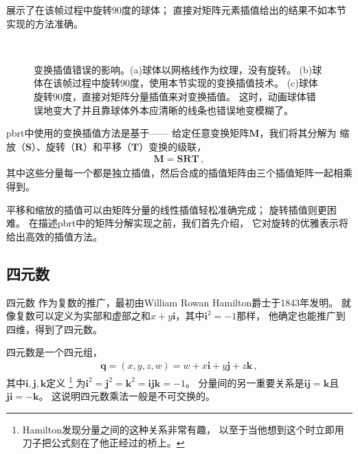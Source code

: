 展示了在该帧过程中旋转90度的球体；
直接对矩阵元素插值给出的结果不如本节实现的方法准确。
\begin{figure}[htbp]
    \raggedright
    \\%
    \quad%
    \begin{minipage}{0.45\textwidth}
        \vspace{-\linewidth}\caption{变换插值错误的影响。(a)球体以网格线作为纹理，没有旋转。
            (b)球体在该帧过程中旋转90度，使用本节实现的变换插值技术。
            (c)球体旋转90度，直接对矩阵分量插值来对变换插值。
            这时，动画球体错误地变大了并且靠球体外本应清晰的线条也错误地变模糊了。}
        \label{fig:2.16}
    \end{minipage}
\end{figure}

pbrt中使用的变换插值方法是基于——
给定任意变换矩阵$\bm M$，我们将其分解为
缩放（$\bm S$）、旋转（$\bm R$）和平移（$\bm T$）变换的级联，
\begin{align*}
    \bm M=\bm S\bm R\bm T\, ,
\end{align*}
其中这些分量每一个都是独立插值，然后合成的插值矩阵由三个插值矩阵一起相乘得到。

平移和缩放的插值可以由矩阵分量的线性插值轻松准确完成；
旋转插值则更困难。
在描述pbrt中的矩阵分解实现之前，我们首先介绍，
它对旋转的优雅表示将给出高效的插值方法。

\subsection{四元数}\label{sub:四元数}
四元数
作为复数的推广，最初由William Rowan Hamilton爵士于1843年发明。
就像复数可以定义为实部和虚部之和$x+y\mathbf{i}$，其中$\mathbf{i}^2=-1$那样，
他确定也能推广到四维，得到了四元数。

四元数是一个四元组，
\begin{align}\label{eq:2.4}
    \bm q=(x,y,z,w)=w+x\mathbf{i}+y\mathbf{j}+z\mathbf{k}\, ,
\end{align}
其中$\mathbf{i}, \mathbf{j}, \mathbf{k}$定义
\footnote{Hamilton发现分量之间的这种关系非常有趣，
    以至于当他想到这个时立即用刀子把公式刻在了他正经过的桥上。}
为$\mathbf{i}^2=\mathbf{j}^2=\mathbf{k}^2=\mathbf{i}\mathbf{j}\mathbf{k}=-1$。
分量间的另一重要关系是$\mathbf{i}\mathbf{j}=\mathbf{k}$且
$\mathbf{j}\mathbf{i}=-\mathbf{k}$。
这说明四元数乘法一般是不可交换的。

